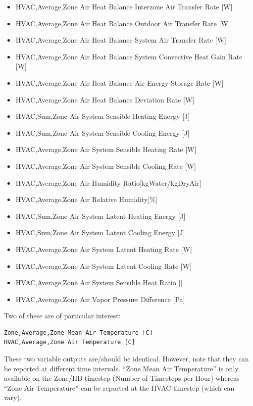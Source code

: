 \begin{itemize}
\item
  HVAC,Average,Zone Air Heat Balance Interzone Air Transfer Rate {[}W{]}
\item
  HVAC,Average,Zone Air Heat Balance Outdoor Air Transfer Rate {[}W{]}
\item
  HVAC,Average,Zone Air Heat Balance System Air Transfer Rate {[}W{]}
\item
  HVAC,Average,Zone Air Heat Balance System Convective Heat Gain Rate {[}W{]}
\item
  HVAC,Average,Zone Air Heat Balance Air Energy Storage Rate {[}W{]}
\item
  HVAC,Average,Zone Air Heat Balance Deviation Rate {[}W{]}
\item
  HVAC,Sum,Zone Air System Sensible Heating Energy {[}J{]}
\item
  HVAC,Sum,Zone Air System Sensible Cooling Energy {[}J{]}
\item
  HVAC,Average,Zone Air System Sensible Heating Rate {[}W{]}
\item
  HVAC,Average,Zone Air System Sensible Cooling Rate {[}W{]}
\item
  HVAC,Average,Zone Air Humidity Ratio{[}kgWater/kgDryAir{]}
\item
  HVAC,Average,Zone Air Relative Humidity{[}\%{]}
\item
  HVAC,Sum,Zone Air System Latent Heating Energy {[}J{]}
\item
  HVAC,Sum,Zone Air System Latent Cooling Energy {[}J{]}
\item
  HVAC,Average,Zone Air System Latent Heating Rate {[}W{]}
\item
  HVAC,Average,Zone Air System Latent Cooling Rate {[}W{]}
\item
  HVAC,Average,Zone Air System Sensible Heat Ratio {[}{]}
\item
  HVAC,Average,Zone Air Vapor Pressure Difference {[}Pa{]}

\end{itemize}

Two of these are of particular interest:

\begin{lstlisting}
Zone,Average,Zone Mean Air Temperature [C]
HVAC,Average,Zone Air Temperature [C]
\end{lstlisting}

These two variable outputs are/should be identical. However, note that they can be reported at different time intervals. ``Zone Mean Air Temperature'' is only available on the Zone/HB timestep (Number of Timesteps per Hour) whereas ``Zone Air Temperature'' can be reported at the HVAC timestep (which can vary).

